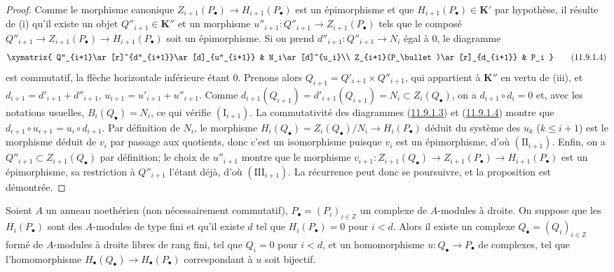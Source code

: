 \begin{proof}
Comme le morphisme canonique $Z_{i+1}(P_\bullet)\to H_{i+1}(P_\bullet)$ est
un épimorphisme et que $H_{i+1}(P_\bullet)\in\boldsymbol{K}'$ par hypothèse, il résulte
de (i) qu'il existe un objet $Q''_{i+1}\in\boldsymbol{K}''$ et un morphisme
$u''_{i+1}:Q''_{i+1}\to Z_{i+1}(P_\bullet)$ tels que le composé
$Q''_{i+1}\to Z_{i+1}(P_\bullet)\to H_{i+1}(P_\bullet)$ soit un
épimorphisme. Si on prend $d''_{i+1}:Q''_{i+1}\to N_i$ égal à $0$, le
diagramme
\[
\xymatrix{
Q''_{i+1}\ar[r]^{d''_{i+1}}\ar[d]_{u''_{i+1}} &
N_i\ar[d]^{u_i}\\
Z_{i+1}(P_\bullet)\ar[r]_{d_{i+1}} & P_i
}
\tag{11.9.1.4}\label{0.11.9.1.4-fr}
\]
est commutatif, la flèche horizontale inférieure étant $0$. Prenons alors $Q_{i+1}=Q'_{i+1}\times Q''_{i+1}$,
qui appartient à $\boldsymbol{K}''$ en vertu de (iii), et
$d_{i+1}=d'_{i+1}+d''_{i+1}$, $u_{i+1}=u'_{i+1}+u''_{i+1}$.
Comme $d_{i+1}(Q_{i+1})=d'_{i+1}(Q_{i+1})=N_i\subset Z_i(Q_\bullet)$, on a
$d_{i+1}\circ d_i=0$ et, avec les notations usuelles,
$B_i(Q_\bullet)=N_i$, ce qui vérifie $(\mathrm I_{i+1})$. La commutativité
des diagrammes (\hyperref[0.11.9.1.3-fr]{11.9.1.3}) et
(\hyperref[0.11.9.1.4-fr]{11.9.1.4}) montre que
$d_{i+1}\circ u_{i+1}=u_i\circ d_{i+1}$. Par définition de $N_i$, le
morphisme
$H_i(Q_\bullet)=Z_i(Q_\bullet)/N_i\to H_i(P_\bullet)$
déduit du système des $u_k$ ($k\leq i+1$) est le morphisme déduit de $v_i$
par passage aux quotients, donc c'est un isomorphisme puisque $v_i$ est un
épimorphisme, d'où $(\mathrm{II}_{i+1})$. Enfin, on a
$Q''_{i+1}\subset Z_{i+1}(Q_\bullet)$ par définition; le choix de
$u''_{i+1}$ montre que le morphisme
$v_{i+1}:Z_{i+1}(Q_\bullet)\to Z_{i+1}(P_\bullet)
\to H_{i+1}(P_\bullet)$
est un épimorphisme, sa restriction à $Q''_{i+1}$ l'étant déjà, d'où
$(\mathrm{III}_{i+1})$. La récurrence peut donc se poursuivre, et la
proposition est démontrée.
\end{proof}

\begin{corollary}[11.9.2]
\label{0.11.9.2-fr}
Soient $A$ un anneau noethérien (non nécessairement commutatif),
$P_\bullet=(P_i)_{i\in\mathbb Z}$ un complexe de $A$-modules à droite. On
suppose que les $H_i(P_\bullet)$ sont des $A$-modules de type fini et qu'il
existe $d$ tel que $H_i(P_\bullet)=0$ pour $i<d$. Alors il existe un complexe
$Q_\bullet=(Q_i)_{i\in\mathbb Z}$ formé de $A$-modules à droite libres de
rang fini, tel que $Q_i=0$ pour $i<d$, et un homomorphisme
$u:Q_\bullet\to P_\bullet$ de complexes, tel que l'homomorphisme
$H_\bullet(Q_\bullet)\to H_\bullet(P_\bullet)$ correspondant à $u$ soit
bijectif.
\end{corollary}


